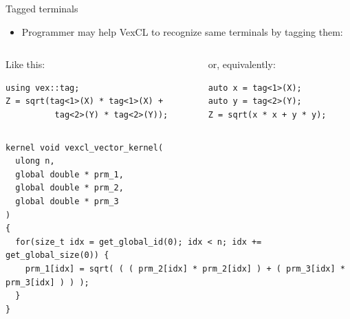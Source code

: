 \documentclass[@BEAMER_OPTIONS@]{beamer}
\begin{document}
\begin{frame}[fragile]{Tagged terminals}
    \begin{itemize}
        \item Programmer may help VexCL to recognize same terminals by
            tagging them:
    \end{itemize}
    \begin{columns}
        \begin{column}{0.46\textwidth}
            \begin{exampleblock}{Like this:}
                \begin{lstlisting}
using vex::tag;
Z = sqrt(tag<1>(X) * tag<1>(X) +
          tag<2>(Y) * tag<2>(Y));
                \end{lstlisting}
            \end{exampleblock}
        \end{column}
        \begin{column}{0.46\textwidth}
            \begin{exampleblock}{or, equivalently:}
                \begin{lstlisting}
auto x = tag<1>(X);
auto y = tag<2>(Y);
Z = sqrt(x * x + y * y);
                \end{lstlisting}
            \end{exampleblock}
        \end{column}
    \end{columns}
    \begin{exampleblock}{}
        \begin{lstlisting}
kernel void vexcl_vector_kernel(
  ulong n,
  global double * prm_1,
  global double * prm_2,
  global double * prm_3
)
{
  for(size_t idx = get_global_id(0); idx < n; idx += get_global_size(0)) {
    prm_1[idx] = sqrt( ( ( prm_2[idx] * prm_2[idx] ) + ( prm_3[idx] * prm_3[idx] ) ) );
  }
}
        \end{lstlisting}
    \end{exampleblock}
\end{frame}

\note{ }
\end{document}
